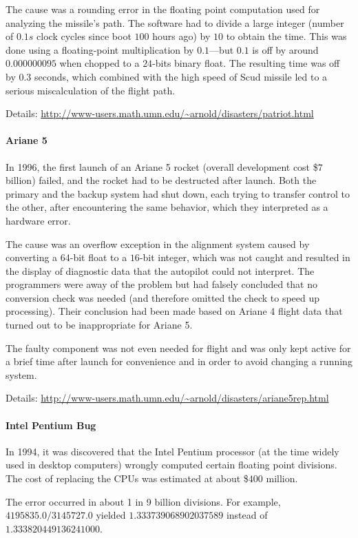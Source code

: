 The cause was a rounding error in the floating point computation used for analyzing the missile's path.
The software had to divide a large integer (number of $0.1s$ clock cycles since boot $100$ hours ago) by $10$ to obtain the time.
This was done using a floating-point multiplication by $0.1$---but $0.1$ is off by around $0.000000095$ when chopped to a $24$-bits binary float.
The resulting time was off by $0.3$ seconds, which combined with the high speed of Scud missile led to a serious miscalculation of the flight path.

Details: \url{http://www-users.math.umn.edu/~arnold/disasters/patriot.html}

\paragraph{Ariane 5}
In 1996, the first launch of an Ariane 5 rocket (overall development cost \$$7$ billion) failed, and the rocket had to be destructed after launch.
Both the primary and the backup system had shut down, each trying to transfer control to the other, after encountering the same behavior, which they interpreted as a hardware error.

The cause was an overflow exception in the alignment system caused by converting a $64$-bit float to a $16$-bit integer, which was not caught and resulted in the display of diagnostic data that the autopilot could not interpret.
The programmers were away of the problem but had falsely concluded that no conversion check was needed (and therefore omitted the check to speed up processing).
Their conclusion had been made based on Ariane 4 flight data that turned out to be inappropriate for Ariane 5.

The faulty component was not even needed for flight and was only kept active for a brief time after launch for convenience and in order to avoid changing a running system.

Details: \url{http://www-users.math.umn.edu/~arnold/disasters/ariane5rep.html}

\paragraph{Intel Pentium Bug}
In 1994, it was discovered that the Intel Pentium processor (at the time widely used in desktop computers) wrongly computed certain floating point divisions.
The cost of replacing the CPUs was estimated at about \$$400$ million.

The error occurred in about 1 in 9 billion divisions.
For example, $4195835.0/3145727.0$ yielded $1.333 739 068 902 037 589$ instead of $1.333 820 449 136 241 000$.

